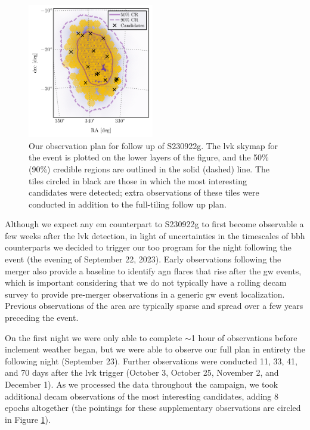 \documentclass[twocolumn]{aastex631}
\newcommand{\gweventid}{S230922g}
\begin{document}
\begin{figure}
    \centering
    \includegraphics[width=0.49\textwidth]{figures/plot_followup_i.pdf}
    \caption{
        Our observation plan for follow up of \gweventid{}.
        The \gls{lvk} skymap for the event is plotted on the lower layers of the figure, and the 50\% (90\%) credible regions are outlined in the solid (dashed) line.
        The tiles circled in black are those in which the most interesting candidates were detected; extra observations of these tiles were conducted in addition to the full-tiling follow up plan.
    }
    \label{fig:plot_followup}
\end{figure}

Although we expect any \gls{em} counterpart to \gweventid{} to first become observable a few weeks after the \gls{lvk} detection, in light of uncertainties in the timescales of \gls{bbh} counterparts we decided to trigger our \gls{too} program for the night following the event (the evening of September 22, 2023).
Early observations following the merger also provide a baseline to identify \gls{agn} flares that rise after the \gls{gw} events, which is important considering that we do not typically have a rolling \gls{decam} survey to provide pre-merger observations in a generic \gls{gw} event localization.
Previous observations of the area are typically sparse and spread over a few years preceding the event.

On the first night we were only able to complete $\sim$1 hour of observations before inclement weather began, but we were able to observe our full plan in entirety the following night (September 23).
Further observations were conducted 11, 33, 41, and 70 days after the \gls{lvk} trigger (October 3, October 25, November 2, and December 1).
As we processed the data throughout the campaign, we took additional \gls{decam} observations of the most interesting candidates, adding 8 epochs altogether (the pointings for these supplementary observations are circled in Figure \ref{fig:plot_followup}).
\end{document}
